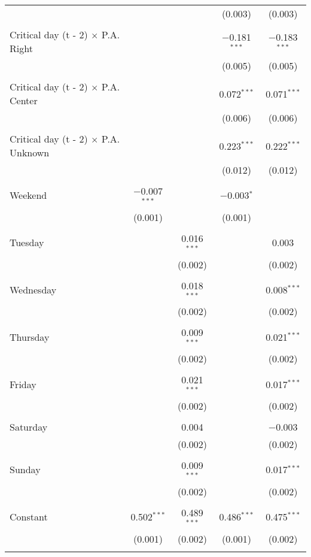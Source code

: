\documentclass[
]{article}
\begin{document}
\begin{table}[!htbp]
{\begin{tabular}{@{\extracolsep{5pt}}lcccc}
  &  &  & (0.003) & (0.003) \\ 
  & & & & \\ 
 Critical day (t - 2) $\times$ P.A. Right &  &  & $-$0.181$^{***}$ & $-$0.183$^{***}$ \\ 
  &  &  & (0.005) & (0.005) \\ 
  & & & & \\ 
 Critical day (t - 2) $\times$ P.A. Center &  &  & 0.072$^{***}$ & 0.071$^{***}$ \\ 
  &  &  & (0.006) & (0.006) \\ 
  & & & & \\ 
 Critical day (t - 2) $\times$ P.A. Unknown &  &  & 0.223$^{***}$ & 0.222$^{***}$ \\ 
  &  &  & (0.012) & (0.012) \\ 
  & & & & \\ 
 Weekend & $-$0.007$^{***}$ &  & $-$0.003$^{*}$ &  \\ 
  & (0.001) &  & (0.001) &  \\ 
  & & & & \\ 
 Tuesday &  & 0.016$^{***}$ &  & 0.003 \\ 
  &  & (0.002) &  & (0.002) \\ 
  & & & & \\ 
 Wednesday &  & 0.018$^{***}$ &  & 0.008$^{***}$ \\ 
  &  & (0.002) &  & (0.002) \\ 
  & & & & \\ 
 Thursday &  & 0.009$^{***}$ &  & 0.021$^{***}$ \\ 
  &  & (0.002) &  & (0.002) \\ 
  & & & & \\ 
 Friday &  & 0.021$^{***}$ &  & 0.017$^{***}$ \\ 
  &  & (0.002) &  & (0.002) \\ 
  & & & & \\ 
 Saturday &  & 0.004 &  & $-$0.003 \\ 
  &  & (0.002) &  & (0.002) \\ 
  & & & & \\ 
 Sunday &  & 0.009$^{***}$ &  & 0.017$^{***}$ \\ 
  &  & (0.002) &  & (0.002) \\ 
  & & & & \\ 
 Constant & 0.502$^{***}$ & 0.489$^{***}$ & 0.486$^{***}$ & 0.475$^{***}$ \\ 
  & (0.001) & (0.002) & (0.001) & (0.002) \\ 
  & & & & \\ 

\end{tabular}}
\end{table}
\end{document}
